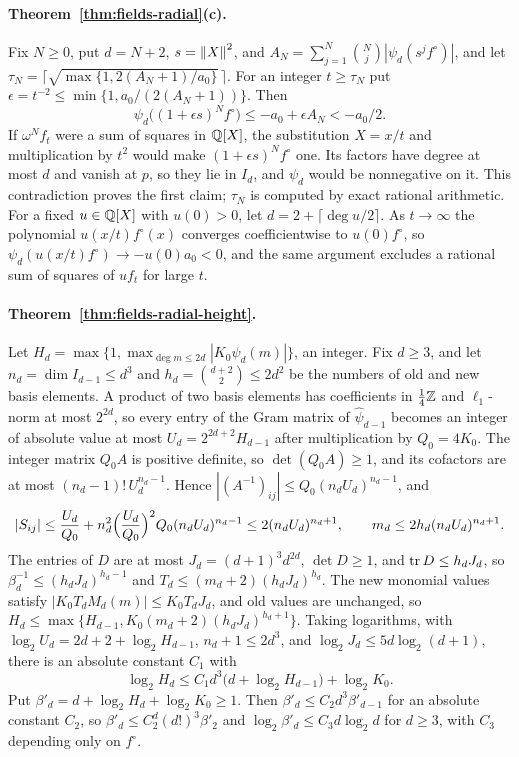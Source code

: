 \paragraph{Theorem~\ref{thm:fields-radial}(c).}
Fix $N\ge0$, put $d=N+2$, $s=\left\lVert X\right\rVert^2$, and
$A_N=\sum_{j=1}^N\binom Nj|\psi_d(s^jf^\circ)|$, and let
$\tau_N=\bigl\lceil\sqrt{\max\{1,2(A_N+1)/a_0\}}\,\bigr\rceil$. For an
integer $t\ge\tau_N$ put $\epsilon=t^{-2}\le\min\{1,a_0/(2(A_N+1))\}$. Then
\[
 \psi_d\bigl((1+\epsilon s)^Nf^\circ\bigr)\le-a_0+\epsilon A_N<-a_0/2 .
\]
If $\omega^Nf_t$ were a sum of squares in $\mathbb Q[X]$, the substitution $X=x/t$ and
multiplication by $t^2$ would make $(1+\epsilon s)^Nf^\circ$ one. Its factors
have degree at most $d$ and vanish at $p$, so they lie in $I_d$, and
$\psi_d$ would be nonnegative on it. This contradiction proves the first
claim; $\tau_N$ is computed by exact rational arithmetic. For a fixed
$u\in\mathbb Q[X]$ with $u(0)>0$, let $d=2+\lceil\deg u/2\rceil$. As $t\to\infty$
the polynomial $u(x/t)f^\circ(x)$ converges coefficientwise to
$u(0)f^\circ$, so $\psi_d(u(x/t)f^\circ)\to-u(0)a_0<0$, and the same argument
excludes a rational sum of squares of $uf_t$ for large $t$.

\paragraph{Theorem~\ref{thm:fields-radial-height}.}
Let $H_d=\max\{1,\max_{\deg m\le2d}|K_0\psi_d(m)|\}$, an integer. Fix
$d\ge3$, and let $n_d=\dim I_{d-1}\le d^3$ and $h_d=\binom{d+2}2\le2d^2$ be
the numbers of old and new basis elements. A product of two basis elements
has coefficients in $\frac14\mathbb Z$ and $\ell_1$-norm at most $2^{2d}$, so every
entry of the Gram matrix of $\hat\psi_{d-1}$ becomes an integer of absolute
value at most $U_d=2^{2d+2}H_{d-1}$ after multiplication by $Q_0=4K_0$. The
integer matrix $Q_0A$ is positive definite, so $\det(Q_0A)\ge1$, and its
cofactors are at most $(n_d-1)!\,U_d^{n_d-1}$. Hence
$|(A^{-1})_{ij}|\le Q_0(n_dU_d)^{n_d-1}$, and
\[
 |S_{ij}|\le\frac{U_d}{Q_0}+n_d^2\Bigl(\frac{U_d}{Q_0}\Bigr)^2Q_0(n_dU_d)^{n_d-1}
 \le2(n_dU_d)^{n_d+1},\qquad m_d\le2h_d(n_dU_d)^{n_d+1}.
\]
The entries of $D$ are at most $J_d=(d+1)^3d^{2d}$, $\det D\ge1$, and
$\operatorname{tr} D\le h_dJ_d$, so $\beta_d^{-1}\le(h_dJ_d)^{h_d-1}$ and
$T_d\le(m_d+2)(h_dJ_d)^{h_d}$. The new monomial values satisfy
$|K_0T_dM_d(m)|\le K_0T_dJ_d$, and old values are unchanged, so
$H_d\le\max\{H_{d-1},K_0(m_d+2)(h_dJ_d)^{h_d+1}\}$. Taking logarithms, with
$\log_2U_d=2d+2+\log_2H_{d-1}$, $n_d+1\le2d^3$, and $\log_2J_d\le5d\log_2(d+1)$,
there is an absolute constant $C_1$ with
\[
 \log_2H_d\le C_1d^3\bigl(d+\log_2H_{d-1}\bigr)+\log_2K_0 .
\]
Put $\beta'_d=d+\log_2H_d+\log_2K_0\ge1$. Then
$\beta'_d\le C_2d^3\beta'_{d-1}$ for an absolute constant $C_2$, so
$\beta'_d\le C_2^d(d!)^3\beta'_2$ and $\log_2\beta'_d\le C_3d\log_2d$ for
$d\ge3$, with $C_3$ depending only on $f^\circ$.

